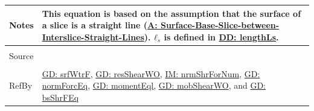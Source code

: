\documentclass[12pt]{article}
\begin{document}
\begin{minipage}{\textwidth}
\begin{tabular}{>{\raggedright}p{}>{\raggedright\arraybackslash}p{}}
Notes & This equation is based on the assumption that the surface of a slice is a straight line (\hyperref[assumpSBSBISL]{A: Surface-Base-Slice-between-Interslice-Straight-Lines}). ${\mathbf{ℓ}_{s}}$ is defined in \hyperref[DD:lengthLs]{DD: lengthLs}.
\\ \midrule \\
Source & \cite{fredlund1977}
\\ \midrule \\
RefBy & \hyperref[GD:srfWtrF]{GD: srfWtrF}, \hyperref[GD:resShearWO]{GD: resShearWO}, \hyperref[IM:nrmShrForNum]{IM: nrmShrForNum}, \hyperref[GD:normForcEq]{GD: normForcEq}, \hyperref[GD:momentEql]{GD: momentEql}, \hyperref[GD:mobShearWO]{GD: mobShearWO}, and \hyperref[GD:bsShrFEq]{GD: bsShrFEq}
\\ \bottomrule
\end{tabular}
\end{minipage}
\end{document}
